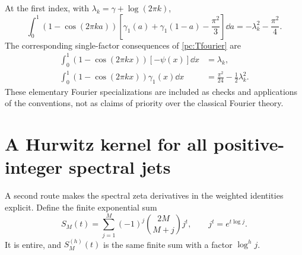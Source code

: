 At the first index, with $\lambda_k=\gamma+\log(2\pi k)$,
\begin{equation}\label{pc:Jweightedexample}
 \int_0^1(1-\cos(2\pi ka))
 \left[\gamma_1(a)+\gamma_1(1-a)-\frac{\pi^2}{3}\right]\dd a
 =-\lambda_k^2-\frac{\pi^2}{4}.
\end{equation}
The corresponding single-factor consequences of \eqref{pc:Tfourier} are
\begin{align}
 \int_0^1(1-\cos(2\pi kx))[-\psi(x)]\dd x&=\lambda_k,\label{pc:single0}\\
 \int_0^1(1-\cos(2\pi kx))\gamma_1(x)\dd x
 &=\frac{\pi^2}{24}-\frac12\lambda_k^2.\label{pc:single1}
\end{align}
These elementary Fourier specializations are included as checks and applications of the conventions, not as claims of priority over the classical Fourier theory.

\section{A Hurwitz kernel for all positive-integer spectral jets}\label{pc:Hurwitzweighted}
A second route makes the spectral zeta derivatives in the weighted identities explicit. Define the finite exponential sum
\begin{equation}\label{pc:SM}
 S_M(t)=\sum_{j=1}^M(-1)^j\binom{2M}{M+j}j^t,
 \qquad j^t=e^{t\log j}.
\end{equation}
It is entire, and $S_M^{(h)}(t)$ is the same finite sum with a factor $\log^h j$.

